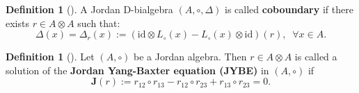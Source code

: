\documentclass[12pt, reqno, a4paper]{amsart}
\theoremstyle{definition}
\newtheorem{definition}[theorem]{Definition}
\newcommand{\id}{\mathrm{id}}
\begin{document}
\begin{definition}[\cite{zhelyabin2000class}]
	A Jordan D-bialgebra $(A, \circ, \Delta)$ is called \textbf{coboundary} if there exists $r \in A \otimes A$ such that:
	\begin{equation}
		\Delta(x) = \Delta_r(x) := ( \id \otimes L_{\circ}(x) - L_{\circ}(x) \otimes \id )(r), \;\; \forall x \in A. \label{eq:jcbd}
	\end{equation}
\end{definition}

\begin{definition}[\cite{zhelyabin2000class}]
	Let $(A, \circ)$ be a Jordan algebra. 
	Then $r \in A \otimes A$ is called a solution of the {\bf Jordan Yang-Baxter equation (JYBE)} in $(A, \circ)$ if
	\begin{equation*}
		\mathbf{J}(r) := r_{12} \circ r_{13} - r_{12} \circ r_{23} + r_{13} \circ r_{23} = 0.
	\end{equation*}
\end{definition}
\end{document}

